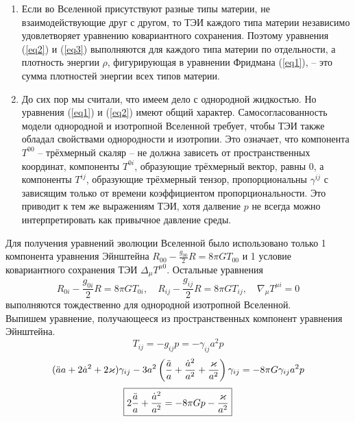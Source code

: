 \documentclass[12pt]{article}
\theoremstyle{definition}
\begin{document}
\begin{enumerate}
    \item Если во Вселенной присутствуют разные типы материи, не взаимодействующие друг с другом, то ТЭИ каждого типа материи независимо удовлетворяет уравнению ковариантного сохранения. Поэтому уравнения (\ref{eq2}) и (\ref{eq3}) выполняются для каждого типа материи по отдельности, а плотность энергии $\rho$, фигурирующая в уравнении Фридмана (\ref{eq1}), -- это сумма плотностей энергии всех типов материи.
    \item До сих пор мы считали, что имеем дело с однородной жидкостью. Но уравнения (\ref{eq1}) и (\ref{eq2}) имеют общий характер. Самосогласованность модели однородной и изотропной Вселенной требует, чтобы ТЭИ также обладал свойствами однородности и изотропии. Это означает, что компонента $T^{00}$ -- трёхмерный скаляр -- не должна зависеть от пространственных координат, компоненты $T^{0i}$, образующие трёхмерный вектор, равны 0, а компоненты $T^{ij}$, образующие трёхмерный тензор, пропорциональны $\gamma^{ij}$ с зависящим только от времени коэффициентом пропорциональности. Это приводит к тем же выражениям ТЭИ, хотя далвение $p$ не всегда можно интерпретировать как привычное давление среды.
\end{enumerate}
Для получения уравнений эволюции Вселенной было использовано только 1 компонента уравнения Эйнштейна $R_{00}-\frac{g_{00}}{2}R=8\pi GT_{00}$ и 1 условие ковариантного сохранения ТЭИ $\Delta_\mu T^{\mu0}$. Остальные уравнения
\begin{equation}
    R_{0i}-\frac{g_{0i}}{2}R=8\pi GT_{0i},\quad R_{ij}-\frac{g_{ij}}{2}R=8\pi GT_{ij},\quad \nabla_\mu T^{\mu i}=0
\end{equation}
выполняются тождественно для однородной изотропной Вселенной.\\
Выпишем уравнение, получающееся из пространственных компонент уравнения Эйнштейна.
\begin{equation}
    T_{ij}=-g_{ij}p=-\gamma_{ij}a^2p
\end{equation}
\begin{equation}
    (\Ddot{a}a+2\dot{a}^2+2\varkappa)\gamma_{ij}-3a^2\left(\frac{\Ddot{a}}{a}+\frac{\dot{a}^2}{a^2}+\frac{\varkappa}{a^2}\right)\gamma_{ij}=-8\pi G\gamma_{ij}a^2p
\end{equation}
\begin{equation}
    \boxed{2\frac{\Ddot{a}}{a}+\frac{\dot{a}^2}{a^2}=-8\pi Gp-\frac{\varkappa}{a^2}}
\end{equation}
\end{document}
